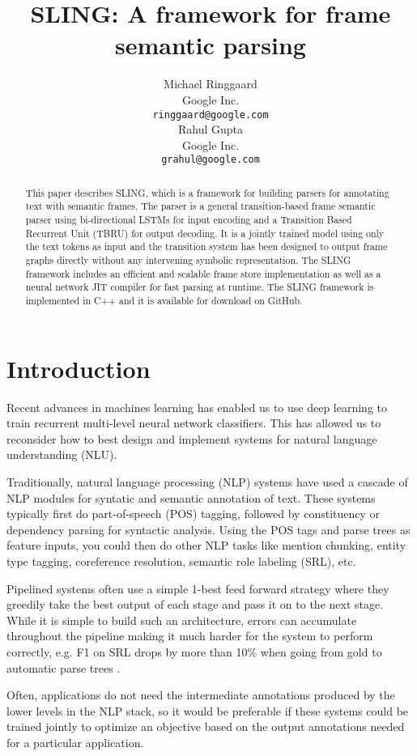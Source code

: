 \documentclass[11pt,a4paper]{article}
\title{SLING: A framework for frame semantic parsing}
\author{
Michael Ringgaard \\ Google Inc. \\ {\tt ringgaard@google.com} \\\And
Rahul Gupta \\ Google Inc. \\ {\tt grahul@google.com} \\
}
\begin{document}
\maketitle

\begin{abstract}
This paper describes SLING, which is a framework for building
parsers for annotating text with semantic frames.
The parser is a general transition-based frame semantic parser using
bi-directional LSTMs for input encoding and a Transition Based Recurrent
Unit (TBRU) for output decoding.
It is a jointly trained model using only the text tokens as input and the
transition system has been designed to output frame graphs directly without
any intervening symbolic representation.
The SLING framework includes an efficient and scalable frame store
implementation as well as a neural network JIT compiler for fast parsing at
runtime.
The SLING framework is implemented in C++ and it is available for download
on GitHub.
\end{abstract}

\section{Introduction}

Recent advances in machines learning has enabled us to use deep learning to
train recurrent multi-level neural network classifiers. This has allowed us to
reconsider how to best design and implement systems for natural language
understanding (NLU).

Traditionally, natural language processing (NLP) systems have used a cascade of
NLP modules for syntatic and semantic annotation of text.
These systems typically first do part-of-speech (POS) tagging, followed by
constituency or dependency parsing for syntactic analysis.
Using the POS tags and parse trees as feature inputs, you could then do other
NLP tasks like mention chunking, entity type tagging, coreference resolution,
semantic role labeling (SRL), etc.

Pipelined systems often use a simple 1-best feed forward strategy \cite{finkel2006}
where they greedily take the best output of each stage and pass it on to the
next stage.
While it is simple to build such an architecture, errors can accumulate
throughout the pipeline making it much harder for the system to perform
correctly, e.g. F1 on SRL drops by more than 10\% when going from gold to
automatic parse trees \cite{toutanova2005}.

Often, applications do not need the intermediate annotations produced
by the lower levels in the NLP stack, so it would be preferable if these systems
could be trained jointly to optimize an objective based on the output
annotations needed for a particular application.
\end{document}
